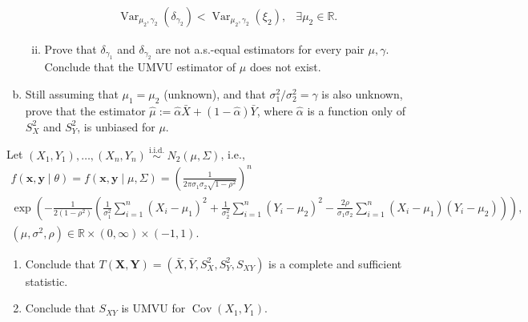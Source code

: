 \begin{exercise}
\begin{enumerate}[(a)]
\begin{enumerate}[(i)]
\[\begin{array}{ll}
            \operatorname{Var}_{\mu_{2}, \gamma_{2}}\left(\delta_{\gamma_{2}}\right)<\operatorname{Var}_{\mu_{2}, \gamma_{2}}\left(\xi_{2}\right), & \exists \mu_{2} \in \mathbb{R}. 
            \end{array}
            \]
            \item Prove that \(\delta_{\gamma_{1}}\) and \(\delta_{\gamma_{2}}\) are not a.s.-equal estimators for every pair \(\mu, \gamma\). Conclude that the UMVU estimator of \(\mu\) does not exist. 
        \end{enumerate}
        \item Still assuming that \(\mu_{1}=\mu_{2}\) (unknown), and that \(\sigma_{1}^{2} / \sigma_{2}^{2}=\gamma\) is also unknown, prove that the estimator \(\widehat{\mu}:=\widehat{\alpha} \bar{X}+(1-\widehat{\alpha}) \bar{Y}\), where \(\widehat{\alpha}\) is a function only of \(S_{X}^{2}\) and \(S_{Y}^{2}\), is unbiased for \(\mu\). 
    \end{enumerate}
\end{exercise}

\begin{exercise}
    Let \(\left(X_{1}, Y_{1}\right), \ldots,\left(X_{n}, Y_{n}\right) \stackrel{\text { i.i.d. }}{\sim} N_{2}(\mu, \Sigma)\), i.e., 
    \[
    \begin{gathered}
    f(\mathbf{x}, \mathbf{y} \mid \theta)=f(\mathbf{x}, \mathbf{y} \mid \mu, \Sigma)=\left(\frac{1}{2 \pi \sigma_{1} \sigma_{2} \sqrt{1-\rho^{2}}}\right)^{n} \\
    \exp \left(-\frac{1}{2\left(1-\rho^{2}\right)}\left(\frac{1}{\sigma_{1}^{2}} \sum_{i=1}^{n}\left(X_{i}-\mu_{1}\right)^{2}+\frac{1}{\sigma_{2}^{2}} \sum_{i=1}^{n}\left(Y_{i}-\mu_{2}\right)^{2}-\frac{2 \rho}{\sigma_{1} \sigma_{2}} \sum_{i=1}^{n}\left(X_{i}-\mu_{1}\right)\left(Y_{i}-\mu_{2}\right)\right)\right), \\
    \left(\mu, \sigma^{2}, \rho\right) \in \mathbb{R} \times(0, \infty) \times(-1,1) .
    \end{gathered}
    \]
    \begin{enumerate}
        \item Conclude that \(T(\mathbf{X}, \mathbf{Y})=\left(\bar{X}, \bar{Y}, S_{X}^{2}, S_{Y}^{2}, S_{X Y}\right)\) is a complete and sufficient statistic. 
        \item Conclude that \(S_{X Y}\) is UMVU for \(\operatorname{Cov}\left(X_{1}, Y_{1}\right)\). 
    \end{enumerate}
\end{exercise}

